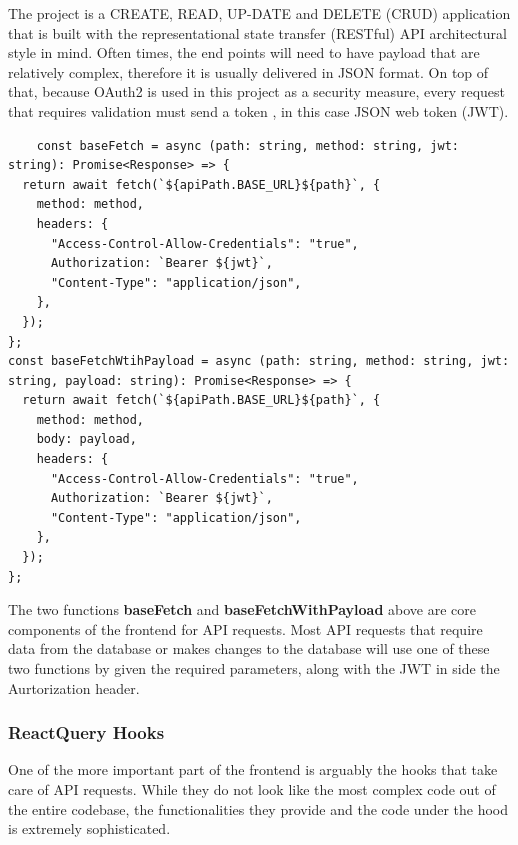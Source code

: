 \documentclass[singlespacing,12pt,parskip,headsepline,consistentlayout]{article}
\begin{document}
The project is a CREATE, READ, UP-DATE and DELETE (CRUD) application that is built with the representational state transfer (RESTful) API architectural style in mind. Often times, the end points will need to have payload that are relatively complex, therefore it is usually delivered in JSON format. On top of that, because OAuth2 is used in this project as a security measure, every request that requires validation must send a token \cite{oauthSimplified}, in this case JSON web token (JWT). \cite{restfulOReilly}

\vspace{0.1cm}

\begin{lstlisting}
    const baseFetch = async (path: string, method: string, jwt: string): Promise<Response> => {
  return await fetch(`${apiPath.BASE_URL}${path}`, {
    method: method,
    headers: {
      "Access-Control-Allow-Credentials": "true",
      Authorization: `Bearer ${jwt}`,
      "Content-Type": "application/json",
    },
  });
};
const baseFetchWtihPayload = async (path: string, method: string, jwt: string, payload: string): Promise<Response> => {
  return await fetch(`${apiPath.BASE_URL}${path}`, {
    method: method,
    body: payload,
    headers: {
      "Access-Control-Allow-Credentials": "true",
      Authorization: `Bearer ${jwt}`,
      "Content-Type": "application/json",
    },
  });
};
\end{lstlisting}

The two functions {\bfseries baseFetch} and {\bfseries baseFetchWithPayload} above are core components of the frontend for API requests. Most API requests that require data from the database or makes changes to the database will use one of these two functions by given the required parameters, along with the JWT in side the Aurtorization header.

\subsubsection{ReactQuery Hooks}

One of the more important part of the frontend is arguably the hooks that take care of API requests. While they do not look like the most complex code out of the entire codebase, the functionalities they provide and the code under the hood is extremely sophisticated.
\end{document}
